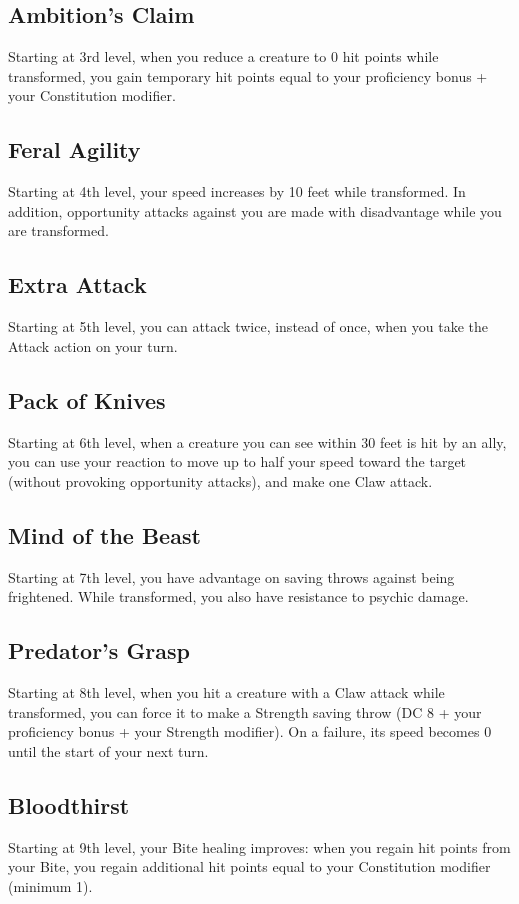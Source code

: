 \documentclass[letterpaper,twocolumn,openany,nodeprecatedcode,breakable,skins,xparse,most]{dndbook}
\begin{document}
\subsection*{Ambition's Claim}
Starting at 3rd level, when you reduce a creature to 0 hit points while transformed, you gain temporary hit points equal to your proficiency bonus + your Constitution modifier.

\subsection*{Feral Agility}
Starting at 4th level, your speed increases by 10 feet while transformed. In addition, opportunity attacks against you are made with disadvantage while you are transformed.

\subsection*{Extra Attack}
Starting at 5th level, you can attack twice, instead of once, when you take the Attack action on your turn.

\subsection*{Pack of Knives}
Starting at 6th level, when a creature you can see within 30 feet is hit by an ally, you can use your reaction to move up to half your speed toward the target (without provoking opportunity attacks), and make one Claw attack.

\subsection*{Mind of the Beast}
Starting at 7th level, you have advantage on saving throws against being frightened. While transformed, you also have resistance to psychic damage.

\subsection*{Predator's Grasp}
Starting at 8th level, when you hit a creature with a Claw attack while transformed, you can force it to make a Strength saving throw (DC 8 + your proficiency bonus + your Strength modifier). On a failure, its speed becomes 0 until the start of your next turn.

\subsection*{Bloodthirst}
Starting at 9th level, your Bite healing improves: when you regain hit points from your Bite, you regain additional hit points equal to your Constitution modifier (minimum 1).
\end{document}
